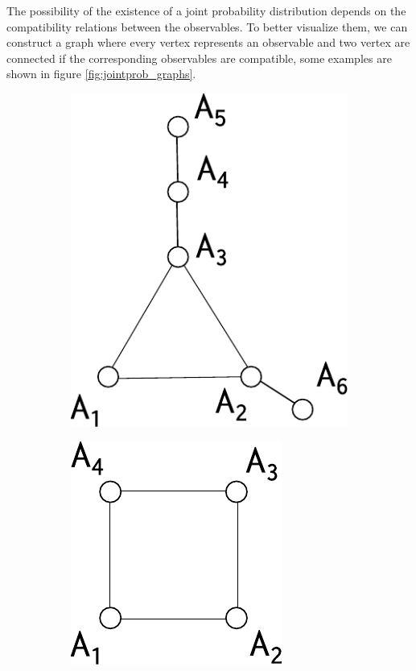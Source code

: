 \documentclass[a4paper]{article}
\theoremstyle{definition}
\begin{document}
The possibility of the existence of a joint probability distribution depends on
the compatibility relations between the observables.
To better visualize them, we can construct a graph where every vertex represents
an observable and two vertex are connected if the corresponding observables are
compatible, some examples are shown in figure \ref{fig:jointprob_graphs}.
\begin{figure}[h]
    \begin{subfigure}{.3\textwidth}
        \center
        \includegraphics[width=.8\textwidth]{prob_graph1.pdf}
        \caption{}
        \label{fig:jointprob_graph1}
    \end{subfigure}
    \begin{subfigure}{.3\textwidth}
        \center
        \includegraphics[width=.7\textwidth]{CHSH_obs.pdf}

\end{subfigure}
\end{figure}
\end{document}
